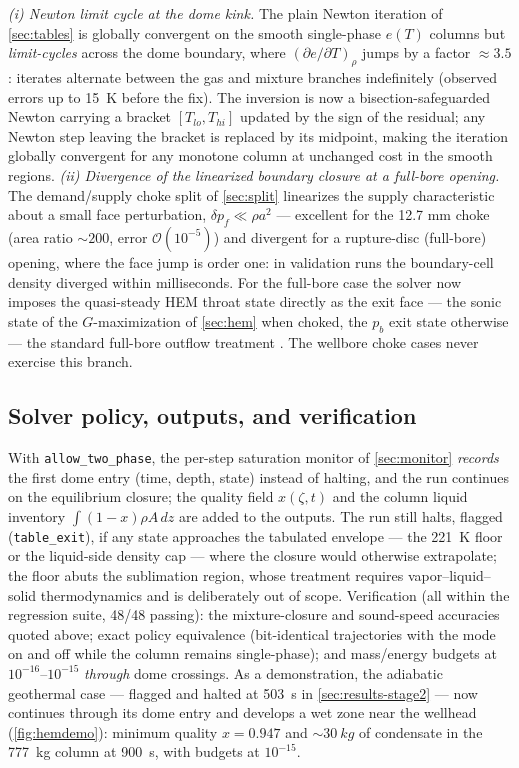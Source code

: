 \documentclass[11pt]{article}
\begin{document}
\emph{(i) Newton limit cycle at the dome kink.} The plain Newton
iteration of \cref{sec:tables} is globally convergent on the smooth
single-phase $e(T)$ columns but \emph{limit-cycles} across the dome
boundary, where $(\partial e/\partial T)_\rho$ jumps by a factor
$\approx 3.5$: iterates alternate between the gas and mixture
branches indefinitely (observed errors up to \SI{15}{K} before the
fix). The inversion is now a bisection-safeguarded Newton carrying a
bracket $[T_{lo}, T_{hi}]$ updated by the sign of the residual; any
Newton step leaving the bracket is replaced by its midpoint, making
the iteration globally convergent for any monotone column at
unchanged cost in the smooth regions.
\emph{(ii) Divergence of the linearized boundary closure at a
full-bore opening.} The demand/supply choke split of \cref{sec:split}
linearizes the supply characteristic about a small face perturbation,
$\delta p_f \ll \rho a^2$ --- excellent for the 12.7 mm choke (area
ratio ${\sim}200$, error $\mathcal{O}(10^{-5})$) and divergent for a
rupture-disc (full-bore) opening, where the face jump is order one:
in validation runs the boundary-cell density diverged within
milliseconds. For the full-bore case the solver now imposes the
quasi-steady HEM throat state directly as the exit face --- the sonic
state of the $G$-maximization of \cref{sec:hem} when choked, the
$p_b$ exit state otherwise --- the standard full-bore outflow
treatment \citep{munkejord2020}. The wellbore choke cases never
exercise this branch.

\subsection{Solver policy, outputs, and verification}

With \texttt{allow\_two\_phase}, the per-step saturation monitor of
\cref{sec:monitor} \emph{records} the first dome entry (time, depth,
state) instead of halting, and the run continues on the equilibrium
closure; the quality field $x(\zeta, t)$ and the column liquid
inventory $\int (1-x)\rho A\,dz$ are added to the outputs. The run
still halts, flagged (\texttt{table\_exit}), if any state approaches
the tabulated envelope --- the \SI{221}{K} floor or the liquid-side
density cap --- where the closure would otherwise extrapolate; the
floor abuts the sublimation region, whose treatment requires
vapor--liquid--solid thermodynamics \citep{hammer2013} and is
deliberately out of scope. Verification (all within the regression
suite, 48/48 passing): the mixture-closure and sound-speed accuracies
quoted above; exact policy equivalence (bit-identical trajectories
with the mode on and off while the column remains single-phase);
and mass/energy budgets at $10^{-16}$--$10^{-15}$ \emph{through}
dome crossings. As a demonstration, the adiabatic geothermal case ---
flagged and halted at \SI{503}{s} in \cref{sec:results-stage2}
--- now continues through its dome entry and develops a wet zone
near the wellhead (\cref{fig:hemdemo}): minimum quality $x = 0.947$
and ${\sim}\SI{30}{kg}$ of condensate in the \SI{777}{kg} column at
\SI{900}{s}, with budgets at $10^{-15}$.
\end{document}
